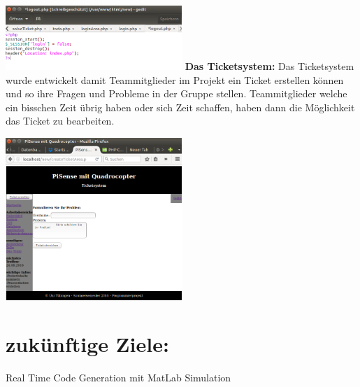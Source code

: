 \documentclass[fleqn,10pt]{SelfArx} %
\begin{document}
\newline 
\newline 
\newline 
\includegraphics[width=0.5\textwidth]{4.png} 
\newline 
\newline 
\textbf{Das Ticketsystem:} \newline 
Das Ticketsystem wurde entwickelt damit Teammitglieder im Projekt ein Ticket erstellen können und so ihre Fragen und Probleme in der Gruppe stellen. Teammitglieder welche ein bisschen Zeit übrig haben oder sich Zeit schaffen, haben dann die Möglichkeit das Ticket zu bearbeiten.

\includegraphics[width=0.5\textwidth]{5.png} 

\section*{zukünftige Ziele:} %

Real Time Code Generation mit MatLab Simulation







\end{document}
